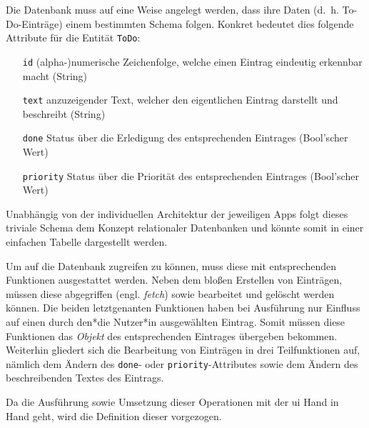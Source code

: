 Die Datenbank muss auf eine Weise angelegt werden, dass ihre Daten (d.\ h. To-Do-Einträge) einem bestimmten Schema folgen. Konkret bedeutet dies folgende Attribute für die Entität \texttt{ToDo}:

\begin{itemize}
	\item[\texttt{id}] (alpha-)numerische Zeichenfolge, welche einen Eintrag eindeutig erkennbar macht (String)
	\item[\texttt{text}] anzuzeigender Text, welcher den eigentlichen Eintrag darstellt und beschreibt (String)
	\item[\texttt{done}] Status über die Erledigung des entsprechenden Eintrages (Bool'scher Wert)
	\item[\texttt{priority}] Status über die Priorität des entsprechenden Eintrages (Bool'scher Wert)
\end{itemize}

Unabhängig von der individuellen Architektur der jeweiligen Apps folgt dieses triviale Schema dem Konzept relationaler Datenbanken und könnte somit in einer einfachen Tabelle dargestellt werden.

Um auf die Datenbank zugreifen zu können, muss diese mit entsprechenden Funktionen ausgestattet werden. Neben dem bloßen Erstellen von Einträgen, müssen diese abgegriffen (engl. \textit{fetch}) sowie bearbeitet und gelöscht werden können. Die beiden letztgenanten Funktionen haben bei Ausführung nur Einfluss auf einen durch den*die Nutzer*in ausgewählten Eintrag. Somit müssen diese Funktionen das \textit{Objekt} des entsprechenden Eintrages übergeben bekommen. Weiterhin gliedert sich die Bearbeitung von Einträgen in drei Teilfunktionen auf, nämlich dem Ändern des \texttt{done}- oder \texttt{priority}-Attributes sowie dem Ändern des beschreibenden Textes des Eintrags.

Da die Ausführung sowie Umsetzung dieser Operationen mit der \ac{ui} Hand in Hand geht, wird die Definition dieser vorgezogen.
